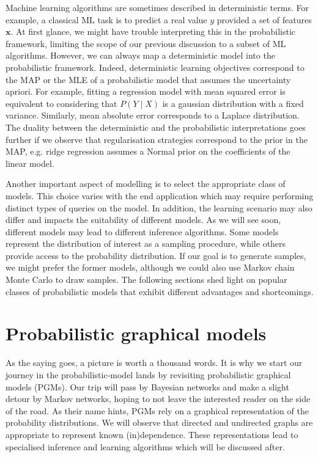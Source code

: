Machine learning algorithms are sometimes described in deterministic terms. For example, a classical ML task is to predict a real value $y$ provided a set of features $\bm x$. At first glance, we might have trouble interpreting this in the probabilistic framework, limiting the scope of our previous discussion to a subset of ML algorithms. However, we can always map a deterministic model into the probabilistic framework. Indeed, deterministic learning objectives correspond to the MAP or the MLE of a probabilistic model that assumes the uncertainty apriori. For example, fitting a regression model with mean squared error is equivalent to considering that $P(Y\mid X)$ is a gaussian distribution with a fixed variance. Similarly, mean absolute error corresponds to a Laplace distribution. The duality between the deterministic and the probabilistic interpretations goes further if we observe that regularisation strategies correspond to the prior in the MAP, e.g. ridge regression assumes a Normal prior on the coefficients of the linear model.

Another important aspect of modelling is to select the appropriate class of models. This choice varies with the end application which may require performing distinct types of queries on the model. In addition, the learning scenario may also differ and impacts the suitability of different models. As we will see soon, different models may lead to different inference algorithms. Some models represent the distribution of interest as a sampling procedure, while others provide access to the probability distribution. If our goal is to generate samples, we might prefer the former models, although we could also use Markov chain Monte Carlo to draw samples. The following sections shed light on popular classes of probabilistic models that exhibit different advantages and shortcomings.

%

\section{Probabilistic graphical models}
As the saying goes, a picture is worth a thousand words. It is why we start our journey in the probabilistic-model lands by revisiting probabilistic graphical models (PGMs). Our trip will pass by Bayesian networks and make a slight detour by Markov networks, hoping to not leave the interested reader on the side of the road. As their name hints, PGMs rely on a graphical representation of the probability distributions. We will observe that directed and undirected graphs are appropriate to represent known (in)dependence. These representations lead to specialised inference and learning algorithms which will be discussed after.

